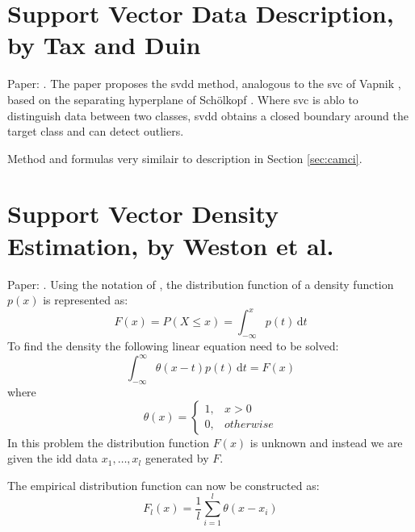 \clearpage
\section{Support Vector Data Description, by Tax and Duin}
Paper: \cite{tax2004support}.
The paper proposes the \gls{svdd} method, analogous to the \gls{svc} of Vapnik \cite{vapnik1998statistical}, based on the separating hyperplane of Sch{\"o}lkopf \etal \cite{scholkopf1999sv}.
Where \gls{svc} is ablo to distinguish data between two classes, \gls{svdd} obtains a closed boundary around the target class and can detect outliers.

Method and formulas very similair to description in Section \ref{sec:camci}.






\clearpage
\section{Support Vector Density Estimation, by Weston et al.}
Paper: \cite{weston1999support}.
Using the notation of \cite{weston1999support}, the distribution function of a density function $p(x)$ is represented as:
%
\begin{equation}
  F(x) = P(X \leq x) = \int_{- \infty}^x p(t)\,\mathrm{d}t
\end{equation}
%
To find the density the following linear equation need to be solved:
%
\begin{equation}
  \int_{-\infty}^\infty \theta(x-t)p(t)\,\mathrm{d}t = F(x)
\end{equation}
%
where
%
\[
  \theta(x) =
  \begin{cases}
    1,& x > 0 \\
    0,& otherwise
  \end{cases}
\]
%
In this problem the distribution function $F(x)$ is unknown and instead we are given the \gls{idd} data $x_1,\dots,x_l$ generated by $F$.

The empirical distribution function can now be constructed as:
%
\begin{equation}
  F_l(x) = \frac{1}{l} \sum_{i=1}^l \theta(x-x_i)
\end{equation}




\clearpage
